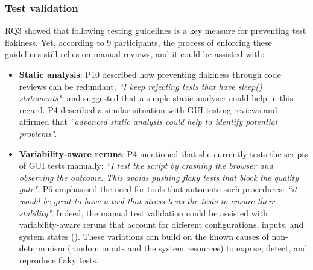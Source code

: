 \subsubsection{\textbf{Test validation}}
\textsc{RQ3} showed that following testing guidelines is a key measure for preventing test flakiness. 
Yet, according to 9 participants, the process of enforcing these guidelines still relies on manual reviews, and it could be assisted with:
\begin{itemize}[wide=10pt,noitemsep,topsep=0pt,label={}]
\item \textbf{Static analysis}: P10 described how preventing flakiness through code reviews can be redundant, \textit{``I keep rejecting tests that have sleep() statements"}, and suggested that a simple static analyser could help in this regard.
P4 described a similar situation with GUI testing reviews and affirmed that \textit{``advanced static analysis could help to identify potential problems"}.

\item \textbf{Variability-aware reruns}: 
P4 mentioned that she currently tests the scripts of GUI tests manually: \textit{``I test the script by crashing the browser and observing the outcome. This avoids pushing flaky tests that block the quality gate"}.
P6 emphasised the need for tools that automate such procedures: \textit{``it would be great to have a tool that stress tests the tests to ensure their stability"}.
Indeed, the manual test validation could be assisted with variability-aware reruns that account for different configurations, inputs, and system states (\eg \cite{WongMLK18}).
These variations can build on the known causes of non-determinism (\eg random inputs and the system resources) to expose, detect, and reproduce flaky tests. 

\end{itemize}


